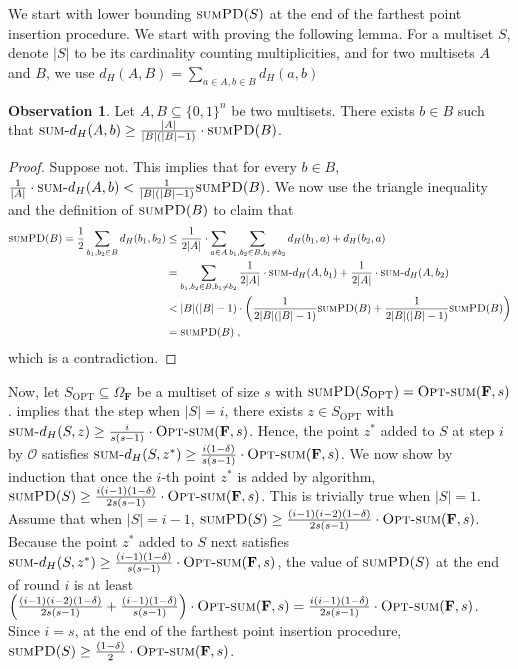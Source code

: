 \documentclass[11pt, letterpaper]{article}
\theoremstyle{definition}
\newtheorem{observation}[theorem]{Observation}
\newcommand{\f}{\mathbf{F}}
\newcommand{\Om}{\Omega_{\f}}
\newcommand{\SPD}{\textsc{sumPD}}
\newcommand{\sumd}{\textsc{sum-}d_H}
\newcommand{\opts}{\textsc{Opt-sum}}
\newcommand{\Sopt}{S_{\text{OPT}}}
\begin{document}
 \medskip \noindent
 We start with lower bounding $\SPD(S)$ at the end of the farthest point insertion procedure. We start with proving the following lemma. For a multiset $S$, denote $|S|$ to be its cardinality counting multiplicities, and for two multisets $A$ and $B$, we use $d_H(A,B)=\sum_{a \in A, b \in B} d_H(a,b)$
 \begin{observation} \label{obs:multisettriangle}
     Let $A,B \subseteq \{0,1\}^n$ be two multisets. There exists $b \in B$ such that $\sumd(A,b) \geq \frac{|A|}{|B|(|B|-1)} \cdot \SPD(B)$.
 \end{observation}
 \begin{proof}
     Suppose not. This implies that for every $b \in B$,  $\frac{1}{|A|} \cdot \sumd(A,b) < \frac{1}{|B|(|B|-1)}\SPD(B)$. We now use the triangle inequality and the definition of $\SPD(B)$ to claim that
     \begin{align*}
         \SPD(B) = \frac{1}{2}\sum_{b_1, b_2 \in B} d_H(b_1, b_2) & \leq \frac{1}{2|A|} \cdot \sum_{a \in A} \sum_{b_1, b_2 \in B, b_1 \neq b_2} d_H(b_1, a) + d_H(b_2, a) \\
         &=  \sum_{b_1, b_2 \in B, b_1 \neq b_2}\frac{1}{2|A|} \cdot \sumd(A, b_1) +\frac{1}{2|A|} \cdot \sumd(A, b_2) \\
         &< |B|(|B|-1) \cdot \left( \frac{1}{2|B|(|B|-1)}\SPD(B) +\frac{1}{2|B|(|B|-1)}\SPD(B)\right) \\ &=\SPD(B) \; ,
     \end{align*}
     which is a contradiction.
 \end{proof}
 \noindent
 Now, let $\Sopt \subseteq \Om$ be a multiset of size $s$ with $\SPD(\Sopt)= \opts(\f,s)$.  implies that the step when $|S|=i$, there exists $z \in \Sopt$ with $\sumd(S, z) \geq \frac{i}{s(s-1)} \cdot \opts(\f,s)$. Hence, the point $z^*$ added to $S$ at step $i$ by $\mathcal{O}$ satisfies $\sumd(S,z^*) \geq \frac{i(1-\delta)}{s(s-1)} \cdot \opts(\f,s)$. We now show by induction that once the $i$-th point $z^*$ is added by algorithm, $\SPD(S) \geq \frac{i(i-1)(1-\delta)}{2s(s-1)} \cdot \opts(\f,s)$. This is trivially true when $|S|=1$. Assume that when $|S|=i-1$, $\SPD(S) \geq \frac{(i-1)(i-2)(1-\delta)}{2s(s-1)} \cdot \opts(\f,s)$. Because the point $z^*$ added to $S$ next satisfies $\sumd(S,z^*) \geq \frac{(i-1)(1-\delta)}{s(s-1)} \cdot \opts(\f,s)$, the value of $\SPD(S)$ at the end of round $i$ is at least $\left(\frac{(i-1)(i-2)(1-\delta)}{2s(s-1)} +  \frac{(i-1)(1-\delta)}{s(s-1)} \right) \cdot \opts(\f,s) = \frac{i(i-1)(1-\delta)}{2s(s-1)} \cdot \opts(\f,s)$. Since $i=s$, at the end of the farthest point insertion procedure, $\SPD(S) \geq \frac{(1-\delta)}{2} \cdot \opts(\f,s)$. 
 
\end{document}

